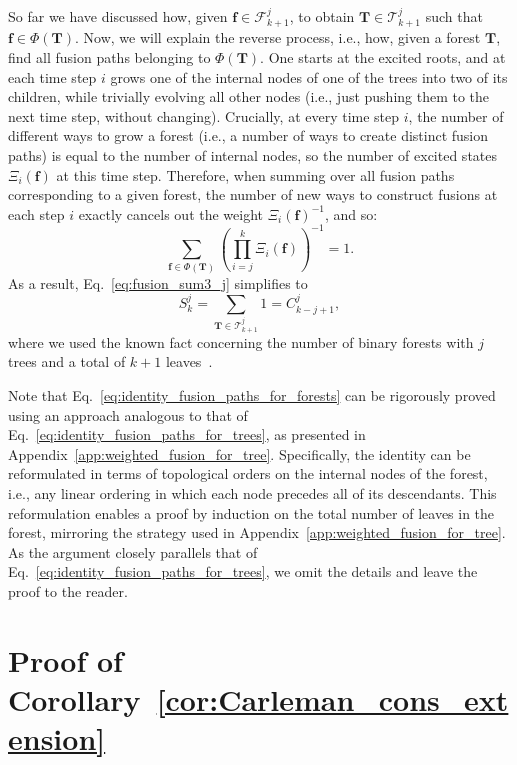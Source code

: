 \documentclass[superscriptaddress,onecolumn,nofootinbib,longbibliography,a4paper,accepted=2026-09-29]{quantumarticle}
\theoremstyle{plain}
\theoremstyle{definition}
\numberwithin{thm}{section}
\numberwithin{assumption}{section}
\numberwithin{lemma}{section}
\numberwithin{prop}{section}
\numberwithin{cor}{section}
\numberwithin{definition}{section}
\numberwithin{rmk}{section}
\numberwithin{equation}{section}
\newcommand\F{ {\mathcal F} }
\newcommand\T{ {\mathcal T} }
\renewcommand{\v}[1]{\ensuremath{\boldsymbol #1}}
\begin{document}
So far we have discussed how, given $\v{f}\in\F^{j}_{k+1}$, to obtain $\v{T}\in\T^{j}_{k+1}$ such that $\v{f}\in\Phi(\v{T})$. Now, we will explain the reverse process, i.e., how, given a forest $\v{T}$, find all fusion paths belonging to $\Phi(\v{T})$. One starts at the excited roots, and at each time step $i$ grows one of the internal nodes of one of the trees into two of its children, while trivially evolving all other nodes (i.e., just pushing them to the next time step, without changing). Crucially, at every time step $i$, the number of different ways to grow a forest (i.e., a number of ways to create distinct fusion paths) is equal to the number of internal nodes, so the number of excited states $\Xi_i(\v{f})$ at this time step. Therefore, when summing over all fusion paths corresponding to a given forest, the number of new ways to construct fusions at each step $i$ exactly cancels out the weight $\Xi_i(\v{f})^{-1}$, and so:
\begin{equation}
    \sum_{\v{f}\in \Phi(\v{T})} \left(\prod_{i=j}^k \Xi_i(\v{f})\right)^{-1} = 1.
    \label{eq:identity_fusion_paths_for_forests}
\end{equation}
As a result, Eq.~\eqref{eq:fusion_sum3_j} simplifies to
\begin{equation}
    \label{eq:fusion_sum4_j}
    S_k^{j} = \sum_{\v{T}\in \T^{j}_{k+1}} 1 = C^{j}_{k-j+1},
\end{equation}
where we used the known fact concerning the number of binary forests with $j$ trees and a total of $k+1$ leaves~\cite{dimitrov2024simple}.

Note that Eq.~\eqref{eq:identity_fusion_paths_for_forests} can be rigorously proved using an approach analogous to that of Eq.~\eqref{eq:identity_fusion_paths_for_trees}, as presented in Appendix~\ref{app:weighted_fusion_for_tree}. Specifically, the identity can be reformulated in terms of topological orders on the internal nodes of the forest, i.e., any linear ordering in which each node precedes all of its descendants. This reformulation enables a proof by induction on the total number of leaves in the forest, mirroring the strategy used in Appendix~\ref{app:weighted_fusion_for_tree}. As the argument closely parallels that of Eq.~\eqref{eq:identity_fusion_paths_for_trees}, we omit the details and leave the proof to the reader.



\section{Proof of Corollary~\ref{cor:Carleman_cons_extension}}
\label{app:thm_cons_ext}
\end{document}
